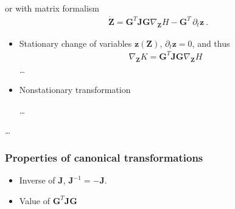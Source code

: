 \documentclass[letterpaper,10pt,english]{jupyterBook}
\begin{document}
\sphinxAtStartPar
or with matrix formalism
\begin{equation*}
\begin{split}\dot{\mathbf{Z}} = \mathbf{G}^T \mathbf{J} \mathbf{G} \nabla_{\mathbf{Z}} H - \mathbf{G}^T \, \partial_t \mathbf{z} \ .\end{split}
\end{equation*}\begin{itemize}
\item {} 
\sphinxAtStartPar
Stationary change of variables \(\mathbf{z}(\mathbf{Z})\), \(\partial_t \mathbf{z} = 0\), and thus
\begin{equation*}
\begin{split}\nabla_{\mathbf{Z}} K = \mathbf{G}^T \mathbf{J} \mathbf{G} \nabla_{\mathbf{Z}} H\end{split}
\end{equation*}
\sphinxAtStartPar
…

\item {} 
\sphinxAtStartPar
Non\sphinxhyphen{}stationary transformation

\sphinxAtStartPar
…

\end{itemize}

\sphinxAtStartPar
…
\subsubsection*{Properties of canonical transformations}
\begin{itemize}
\item {} 
\sphinxAtStartPar
Inverse of \(\mathbf{J}\), \(\mathbf{J}^{-1} = - \mathbf{J}\).

\item {} 
\sphinxAtStartPar
Value of \(\mathbf{G}^T \mathbf{J} \mathbf{G}\)

\sphinxAtStartPar
{}

\end{itemize}
\end{document}
